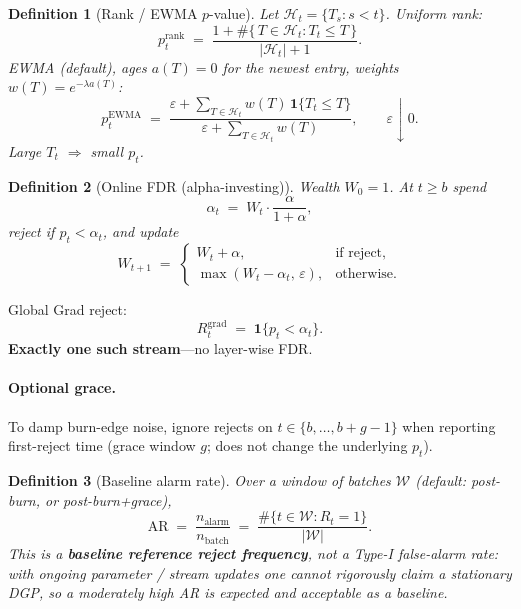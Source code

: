 \documentclass[11pt]{article}
\newtheorem{definition}{Definition}
\begin{document}
\begin{definition}[Rank / EWMA $p$-value]
Let $\mathcal{H}_{t}=\{T_s:s<t\}$. Uniform rank:
\begin{equation}
\label{eq:prank}
  p_t^{\mathrm{rank}}
  \;=\;
  \frac{1 + \#\{\, T\in\mathcal{H}_{t}: T_t \le T \,\}}
       {|\mathcal{H}_{t}| + 1}.
\end{equation}
EWMA (default), ages $a(T)=0$ for the newest entry,
weights $w(T)=e^{-\lambda a(T)}$:
\begin{equation}
\label{eq:pewma}
  p_t^{\mathrm{EWMA}}
  \;=\;
  \frac{\varepsilon + \sum_{T\in\mathcal{H}_{t}} w(T)\,
        \mathbf{1}\{T_t \le T\}}
       {\varepsilon + \sum_{T\in\mathcal{H}_{t}} w(T)},
  \qquad \varepsilon\downarrow 0.
\end{equation}
Large $T_t$ $\Rightarrow$ small $p_t$.
\end{definition}

\begin{definition}[Online FDR (alpha-investing)]
Wealth $W_0=1$. At $t\ge b$ spend
\begin{equation}
\label{eq:alphat}
  \alpha_t \;=\; W_t \cdot \frac{\alpha}{1+\alpha},
\end{equation}
reject if $p_t < \alpha_t$, and update
\begin{equation}
\label{eq:wealth}
  W_{t+1}
  \;=\;
  \begin{cases}
    W_t + \alpha, & \text{if reject},\\[0.25em]
    \max(W_t - \alpha_t,\,\varepsilon), & \text{otherwise}.
  \end{cases}
\end{equation}
\end{definition}

Global Grad reject:
\begin{equation}
\label{eq:Rt}
  R_t^{\mathrm{grad}}
  \;=\;
  \mathbf{1}\{ p_t < \alpha_t \}.
\end{equation}
\textbf{Exactly one such stream}---no layer-wise FDR.

\paragraph{Optional grace.}
To damp burn-edge noise, ignore rejects on
$t\in\{b,\ldots,b+g-1\}$ when reporting first-reject time
(grace window $g$; does not change the underlying $p_t$).

\begin{definition}[Baseline alarm rate]
Over a window of batches $\mathcal{W}$ (default: post-burn, or post-burn+grace),
\begin{equation}
\label{eq:AR}
  \mathrm{AR}
  \;=\;
  \frac{n_{\mathrm{alarm}}}{n_{\mathrm{batch}}}
  \;=\;
  \frac{\#\{ t\in\mathcal{W}: R_t=1 \}}{|\mathcal{W}|}.
\end{equation}
This is a \textbf{baseline reference reject frequency}, \emph{not} a Type-I
false-alarm rate: with ongoing parameter / stream updates one cannot
rigorously claim a stationary DGP, so a moderately high AR is expected
and acceptable as a baseline.
\end{definition}
\end{document}
